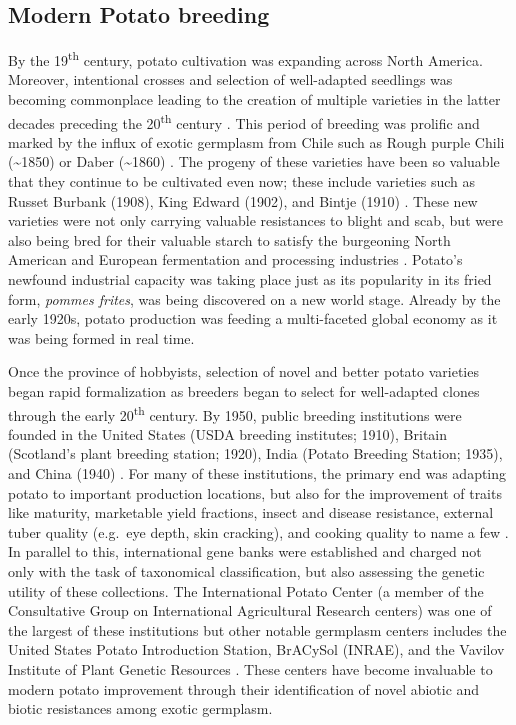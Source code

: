 \begin{refsection}
\section{Modern Potato breeding}\label{modern-potato-breeding}

By the 19\textsuperscript{th} century, potato cultivation was expanding
across North America. Moreover, intentional crosses and selection of
well-adapted seedlings was becoming commonplace leading to the creation
of multiple varieties in the latter decades preceding the
20\textsuperscript{th} century \parencite{Stevenson1937}. This period of
breeding was prolific and marked by the influx of exotic germplasm from
Chile such as Rough purple Chili (\textasciitilde1850) or Daber
(\textasciitilde1860) \parencite{Glendinning1983,Plaisted1989}. The
progeny of these varieties have been so valuable that they continue to
be cultivated even now; these include varieties such as Russet Burbank
(1908), King Edward (1902), and Bintje (1910) \parencite{VanBerloo2007}.
These new varieties were not only carrying valuable resistances to
blight and scab, but were also being bred for their valuable starch to
satisfy the burgeoning North American and European fermentation and
processing industries \parencite{Willard1993}. Potato's newfound
industrial capacity was taking place just as its popularity in its fried
form, \emph{pommes frites}, was being discovered on a new world
stage. Already by the early 1920s, potato production was feeding a
multi-faceted global economy as it was being formed in real time.

Once the province of hobbyists, selection of novel and better potato
varieties began rapid formalization as breeders began to select for
well-adapted clones through the early 20\textsuperscript{th} century. By
1950, public breeding institutions were founded in the United States
(USDA breeding institutes; 1910), Britain (Scotland's plant breeding
station; 1920), India (Potato Breeding Station; 1935), and China (1940)
\parencite{Luthra2006,Jansky2009,Bradshaw2009,Jansky2018}. For many of
these institutions, the primary end was adapting potato to important
production locations, but also for the improvement of traits like
maturity, marketable yield fractions, insect and disease resistance,
external tuber quality (e.g.~eye depth, skin cracking), and cooking
quality to name a few \parencite{Krantz1946,Douches1996}. In parallel to
this, international gene banks were established and charged not only
with the task of taxonomical classification, but also assessing the
genetic utility of these collections. The International Potato Center (a
member of the Consultative Group on International Agricultural Research
centers) was one of the largest of these institutions but other notable
germplasm centers includes the United States Potato Introduction
Station, BrACySol (INRAE), and the Vavilov Institute of Plant Genetic
Resources \parencite{Huaman1986,Bamberg1994,Dalamu2025}. These centers
have become invaluable to modern potato improvement through their
identification of novel abiotic and biotic resistances among exotic
germplasm.


\end{refsection}
